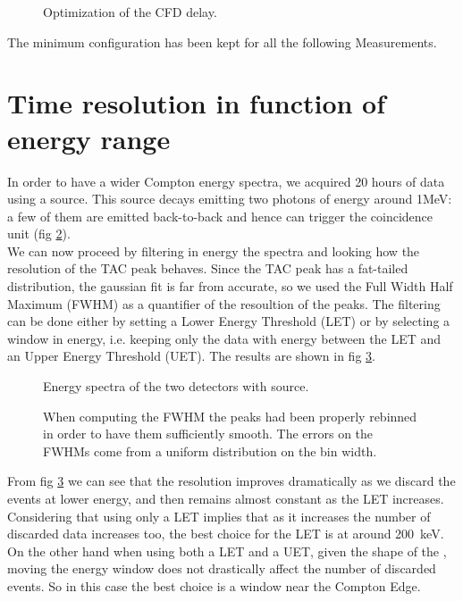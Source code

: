 \documentclass[11pt,a4 paper]{article}
\begin{document}
\begin{figure}[H]
    \centering
    \caption{Optimization of the CFD delay.}
    \label{fig:CFD:delay}
\end{figure}

The minimum configuration has been kept for all the following Measurements.

\section{Time resolution in function of energy range}
In order to have a wider Compton energy spectra, we acquired 20 hours of data using a  source. This source decays emitting two photons of energy around 1\si{\mega\electronvolt}: a few of them are emitted back-to-back and hence can trigger the coincidence unit (fig \ref{fig:Co:spectra}).\\
We can now proceed by filtering in energy the spectra and looking how the resolution of the TAC peak behaves. Since the TAC peak has a fat-tailed distribution, the gaussian fit is far from accurate, so we used the Full Width Half Maximum (FWHM) as a quantifier of the resoultion of the peaks.
The filtering can be done either by setting a Lower Energy Threshold (LET) or by selecting a window in energy, i.e. keeping only the data with energy between the LET and an Upper Energy Threshold (UET). The results are shown in fig \ref{fig:Co:results}.

\begin{figure}[H]
    \centering
    \caption{Energy spectra of the two detectors with  source.}
    \label{fig:Co:spectra}
\end{figure}

\begin{figure}[H]
    \centering
    \caption{When computing the FWHM the peaks had been properly rebinned in order to have them sufficiently smooth. The errors on the FWHMs come from a uniform distribution on the bin width.}
    \label{fig:Co:results}
\end{figure}

From fig \ref{fig:Co:results} we can see that the resolution improves dramatically as we discard the events at lower energy, and then remains almost constant as the LET increases. Considering that using only a LET implies that as it increases the number of discarded data increases too, the best choice for the LET is at around \SI{200}{\kilo\electronvolt}. On the other hand when using both a LET and a UET, given the shape of the , moving the energy window does not drastically affect the number of discarded events. So in this case the best choice is a window near the Compton Edge.
\end{document}
